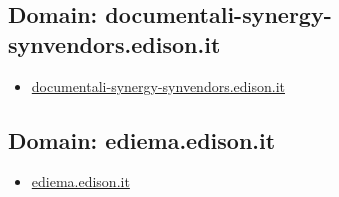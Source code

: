 \documentclass{article}
\begin{document}
    \subsection{Domain: documentali-synergy-synvendors.edison.it}
    \begin{itemize}
        
            
                
                \item \href{ https://documentali-synergy-synvendors.edison.it/account/login?ReturnUrl=\%2Fvefa\%2Fhome}{ documentali-synergy-synvendors.edison.it }
            
        
    \end{itemize}

    \subsection{Domain: ediema.edison.it}
    \begin{itemize}
        
            
                
                \item \href{ http://ediema.edison.it/}{ ediema.edison.it }
            
        
    \end{itemize}
\end{document}
